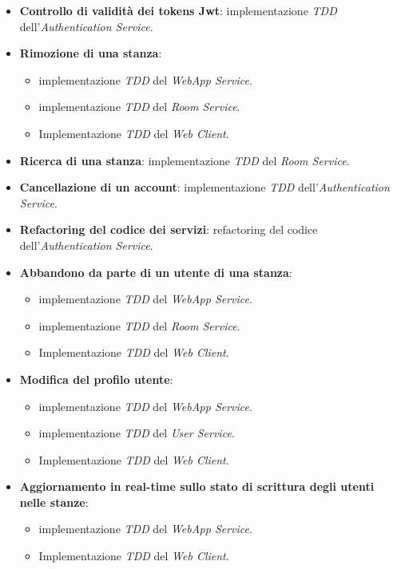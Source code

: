 \begin{itemize}
    \item \textbf{Controllo di validità dei tokens Jwt}: 
    implementazione \textit{TDD} dell'\textit{Authentication Service}.
        
     \item \textbf{Rimozione di una stanza}: 
    \begin{itemize}
        \item implementazione \textit{TDD} del \textit{WebApp Service}.
        \item implementazione \textit{TDD} del \textit{Room Service}.
        \item Implementazione \textit{TDD} del \textit{Web Client}.
    \end{itemize}   
        
    \item \textbf{Ricerca di una stanza}: implementazione \textit{TDD} del \textit{Room Service}.

    \item \textbf{Cancellazione di un account}: implementazione \textit{TDD} 
    dell'\textit{Authentication Service}.
        
    \item \textbf{Refactoring del codice dei servizi}: refactoring del codice 
    dell'\textit{Authentication Service}.
    
    \item \textbf{Abbandono da parte di un utente di una stanza}: 
    \begin{itemize}
        \item implementazione \textit{TDD} del \textit{WebApp Service}.
        \item implementazione \textit{TDD} del \textit{Room Service}.
        \item Implementazione \textit{TDD} del \textit{Web Client}.
    \end{itemize}  
    
    \item \textbf{Modifica del profilo utente}: 
    \begin{itemize}
        \item implementazione \textit{TDD} del \textit{WebApp Service}.
        \item implementazione \textit{TDD} del \textit{User Service}.
        \item Implementazione \textit{TDD} del \textit{Web Client}.
    \end{itemize}  
    
    \item \textbf{Aggiornamento in real-time sullo stato di scrittura degli utenti nelle stanze}: 
    \begin{itemize}
        \item implementazione \textit{TDD} del \textit{WebApp Service}.
        \item Implementazione \textit{TDD} del \textit{Web Client}.
    \end{itemize}  
    
\end{itemize}

